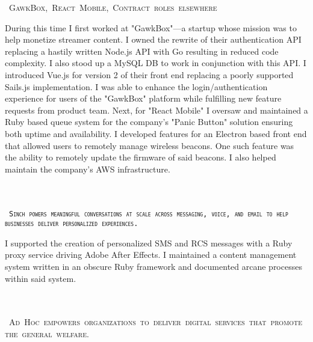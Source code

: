 \documentclass{muratcan_cv}
\begin{document}
    \mbox { \scshape \hspace{1.2em} \tiny{GawkBox, React Mobile, Contract roles elsewhere}}\\
    \indent \indent \begin{minipage}{0.96\linewidth} \footnotesize
            During this time I first worked at "GawkBox"—a startup whose mission was to help monetize streamer content. I owned the rewrite of their authentication API replacing a hastily written Node.js API with Go resulting in reduced code complexity. I also stood up a MySQL DB to work in conjunction with this API. I introduced Vue.js for version 2 of their front end replacing a poorly supported Sails.js implementation. I was able to enhance the login/authentication experience for users of the "GawkBox" platform while fulfilling new feature requests from product team. Next, for "React Mobile" I oversaw and maintained a Ruby based queue system for the company's "Panic Button" solution ensuring both uptime and availability. I developed features for an Electron based front end that allowed users to remotely manage wireless beacons. One such feature was the ability to remotely update the firmware of said beacons. I also helped maintain the company's AWS infrastructure.
    \end{minipage} \\[0.1cm]\\
    \mbox { \scshape \hspace{1.2em} \tiny{\texttt{Sinch powers meaningful conversations at scale across
    messaging, voice, and email to help businesses deliver personalized experiences.}}}\\
    \indent \indent \begin{minipage}{0.96\linewidth} \footnotesize
     I supported the creation of personalized SMS and RCS messages with a Ruby proxy service driving Adobe After Effects. I maintained a content management system written in an obscure Ruby framework and documented arcane processes within said system.
    \end{minipage} \\[0.1cm]\\
    \mbox { \scshape \hspace{1.2em} \tiny{Ad Hoc empowers organizations to deliver digital
    services that promote the general welfare.}}\\
\end{document}

